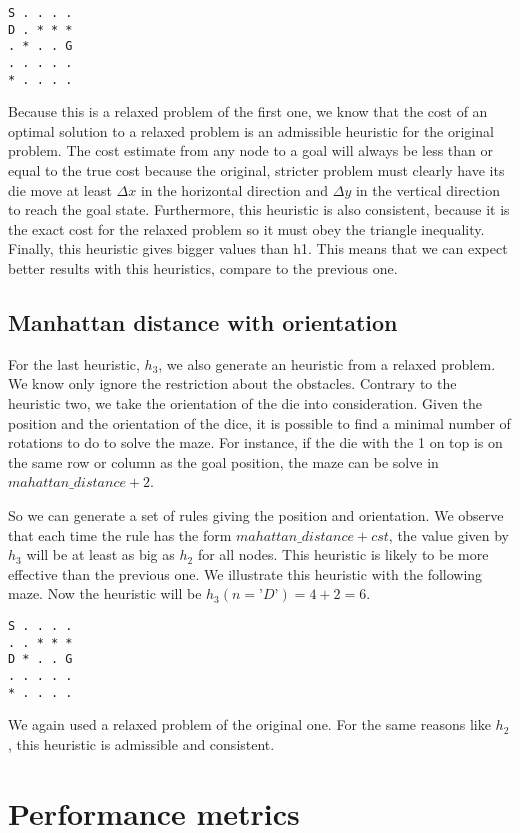 \documentclass[]{article}
\begin{document}
\begin{lstlisting}
S . . . .
D . * * *
. * . . G
. . . . .
* . . . .
\end{lstlisting}

Because this is a relaxed problem of the first one, we know that the cost of an optimal solution to a relaxed problem is an admissible heuristic for the original problem.  The cost estimate from any node to a goal will always be less than or equal to the true cost because the original, stricter problem must clearly have its die move at least $\Delta x$ in the horizontal direction and $\Delta y$ in the vertical direction to reach the goal state.
Furthermore, this heuristic is also consistent, because it is the exact cost for the relaxed problem so it must obey the triangle inequality.
Finally, this heuristic gives bigger values than h1. This means that we can expect better results with this heuristics, compare to the previous one. 


\subsection{Manhattan distance with orientation}
For the last heuristic, $h_3$, we also generate an heuristic from a relaxed problem.
We know only ignore the restriction about the obstacles.
Contrary to the heuristic two, we take the orientation of the die into consideration.
Given the position and the orientation of the dice, it is possible to find a minimal number of rotations to do to solve the maze.
For instance, if the die with the 1 on top is on the same row or column as the goal position, the maze can be solve in $mahattan\_distance + 2$.

So we can generate a set of rules giving the position and orientation.
We observe that each time the rule has the form  $mahattan\_distance + cst$, the value given by $h_3$ will be at least as big as $h_2$ for all nodes.
This heuristic is likely to be more effective than the previous one.
We illustrate this heuristic with the following maze.
Now the heuristic will be $h_3(n=’D’) = 4 + 2 = 6$.

\begin{lstlisting}
S . . . .
. . * * *
D * . . G
. . . . .
* . . . .
\end{lstlisting}

We again used a relaxed problem of the original one.
For the same reasons like $h_2$, this heuristic is admissible and consistent.

\section{Performance metrics}
\end{document}
